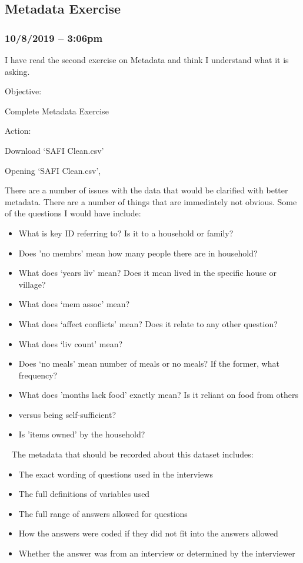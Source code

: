 \documentclass{article}
\begin{document}
\subsection{Metadata Exercise}
\subsubsection*{10/8/2019 – 3:06pm}
I have read the second exercise on Metadata and think I understand what it is asking.
\par
Objective:\par
Complete Metadata Exercise\par
Action:\par
Download ‘SAFI Clean.csv’\par
Opening ‘SAFI Clean.csv’,\par
There are a number of issues with the data that would be clarified with better metadata. There are a number of things that are immediately not obvious. Some of the questions I would have include:
\begin{itemize}
\item What is key ID referring to? Is it to a household or family?
\item Does 'no membrs' mean how many people there are in household?
\item What does ‘years liv’ mean? Does it mean lived in the specific house or village?
\item What does ‘mem assoc’ mean?
\item What does ‘affect conflicts’ mean? Does it relate to any other question?
\item What does ‘liv count’ mean?
\item Does ‘no meals’ mean number of meals or no meals? If the former, what frequency?
\item What does 'months lack food' exactly mean? Is it reliant on food from others \item versus being self-sufficient?
\item Is 'items owned' by the household?
\end{itemize} 
The metadata that should be recorded about this dataset includes:
\begin{itemize}
\item The exact wording of questions used in the interviews
\item The full definitions of variables used
\item The full range of answers allowed for questions
\item How the answers were coded if they did not fit into the answers allowed
\item Whether the answer was from an interview or determined by the interviewer
\end{itemize}
\end{document}
